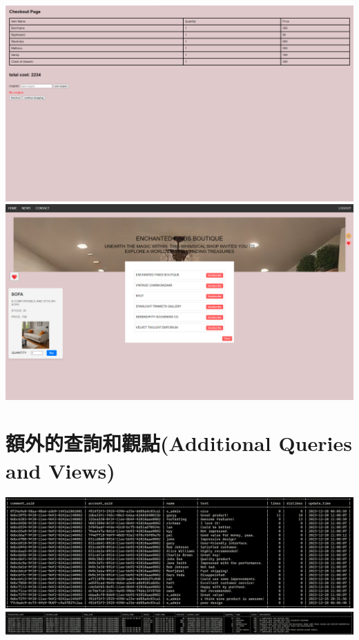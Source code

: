 \documentclass[a4paper, 12pt]{article}
\begin{document}
\begin{center}
\includegraphics[scale=0.3]{ui/checkoutPage.png}
\includegraphics[scale=0.3]{ui/subscription.png}



\end{center}
\newpage
\section{額外的查詢和觀點(Additional Queries and Views)}
\includegraphics[scale=0.35]{view/view1.png}
\includegraphics[scale=0.35]{view/view2.png}
\end{document}
